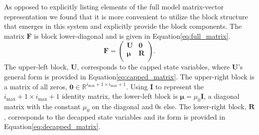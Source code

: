 \documentclass[a4,center,fleqn]{NAR}
\newcommand{\imax}{\ensuremath{{i_{\max}}}\xspace}
\let\bs\boldsymbol
\begin{document}
As opposed to explicitly listing elements of the full model matrix-vector representation we found that it is more convenient to utilize the block structure that emerges in this system and explicitly provide the block components.
The matrix $\bs{F}$ is block lower-diagonal and is given in Equation\ref{eq:full_matrix}.
\begin{equation}
\bs{F}=\left(\begin{array}{cc}
\bs{U} & \bs{0} \\
\bs{\mu} & \bs{R} \\
\end{array} \right).
\end{equation}
The upper-left block, $\bs{U}$, corresponds to the capped state variables, where $\bs{U}$'s general form is provided in Equation\ref{eq:capped_matrix}.
The upper-right block is a matrix of all zeros, $\bs{0}\in\mathbb{R}^{\imax+1\times \imax+1}$.
Using $\bs{I}$ to represent the $\imax+1\times \imax+1$ identity matrix, the lower-left block is $\bs{\mu}=\mu_0\bs{I}$, a diagonal matrix with the constant $\mu_0$ on the diagonal and 0s else.
The lower-right block, $\bs{R}$, corresponds to the decapped state variables and its form is provided in Equation\ref{eq:decapped_matrix}.
\end{document}
